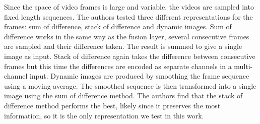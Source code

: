 Since the space of video frames is large and variable, the videos are sampled into fixed length sequences. The authors tested three different representations for the frames: sum of difference, stack of difference and dynamic images. Sum of difference works in the same way as the fusion layer, several consecutive frames are sampled and their difference taken. The result is summed to give a single image as input. Stack of difference again takes the difference between consecutive frames but this time the differences are encoded as separate channels in a multi-channel input.  Dynamic images are produced by smoothing the frame sequence using a moving average. The smoothed sequence is then transformed into a single image using the sum of difference method. The authors find that the stack of difference method performs the best, likely since it preserves the most information, so it is the only representation we test in this work. 
